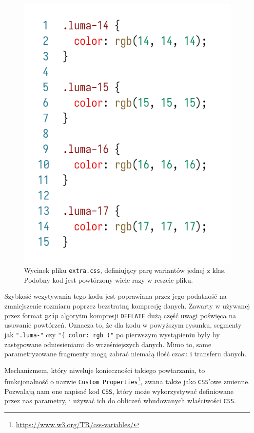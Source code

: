 \documentclass[licencjacka]{pracadypl}
\begin{document}
\begin{figure}[H]
  \centering
  \includegraphics[width=\linewidth/\real{2.5}]{images/code-css-luma.png}
  \caption{Wycinek pliku \texttt{extra.css}, definiujący parę wariantów jednej z klas. Podobny kod jest powtórzony wiele razy w reszcie pliku.}
  \label{fig:css-css-luma}
\end{figure}

Szybkość wczytywania tego kodu jest poprawiana przez jego podatność na zmniejszenie rozmiaru poprzez bezstratną kompresję danych. Zawarty w używanej przez format \texttt{gzip} algorytm kompresji \texttt{DEFLATE} dużą część uwagi poświęca na usuwanie powtórzeń. Oznacza to, że dla kodu w powyższym rysunku, segmenty jak \texttt{".luma-"} czy \texttt{"\{ color: rgb ("} po pierwszym wystąpieniu były by zastępowane odniesieniami do wcześniejszych danych. Mimo to, same parametryzowane fragmenty mogą zabrać niemałą ilość czasu i transferu danych.

Mechanizmem, który niweluje konieczności takiego powtarzania, to funkcjonalność o nazwie \texttt{Custom Properties}\footnote{\url{https://www.w3.org/TR/css-variables/}}, zwana także jako \texttt{CSS}'owe zmienne. Pozwalają nam one napisać kod \texttt{CSS}, który może wykorzystywać definiowane przez nas parametry, i używać ich do obliczeń wbudowanych właściwości \texttt{CSS}.
\end{document}
